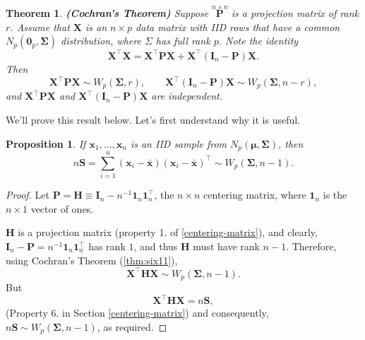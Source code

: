 \documentclass[
]{book}
\newtheorem{theorem}{Theorem}[chapter]
\newtheorem{proposition}{Proposition}[chapter]
\theoremstyle{definition}
\theoremstyle{definition}
\theoremstyle{definition}
\theoremstyle{definition}
\theoremstyle{remark}
\begin{document}
\begin{theorem}
\protect\hypertarget{thm:six11}{}{\label{thm:six11} }\textbf{(Cochran's Theorem)} Suppose \(\stackrel{n \times n}{\mathbf P}\) is a projection matrix of rank \(r\). Assume that \(\mathbf X\) is an \(n \times p\) data matrix with IID rows that have a common \(N_p({\mathbf 0}_p, \boldsymbol{\Sigma})\) distribution, where \(\Sigma\) has full rank \(p\). Note the identity
\begin{equation}
\mathbf X^\top \mathbf X= \mathbf X^\top {\mathbf P} \mathbf X+ \mathbf X^\top ({\mathbf I}_n -{\mathbf P})\mathbf X.
\label{eq:Cochran1}
\end{equation}
Then
\begin{equation}
\mathbf X^\top {\mathbf P} \mathbf X\sim W_p(\boldsymbol{\Sigma}, r), \qquad  \mathbf X^\top ({\mathbf I}_n -{\mathbf P})\mathbf X\sim W_p(\boldsymbol{\Sigma}, n-r),
\label{eq:Cochran2}
\end{equation}
and \(\mathbf X^\top {\mathbf P} \mathbf X\) and \(\mathbf X^\top ({\mathbf I}_n -{\mathbf P})\mathbf X\)
are independent.
\end{theorem}

We'll prove this result below. Let's first understand why it is useful.

\begin{proposition}
\protect\hypertarget{prp:six12}{}{\label{prp:six12} }If \(\mathbf x_1,\ldots,\mathbf x_n\) is an IID sample from \(N_p({\boldsymbol{\mu}},\boldsymbol{\Sigma})\), then
\[ n \mathbf S= \sum_{i=1}^n (\mathbf x_i - \bar{\mathbf x})(\mathbf x_i - \bar{\mathbf x})^\top \sim W_p(\boldsymbol{\Sigma},n-1).\]
\end{proposition}

\begin{proof}
Let \(\mathbf P= {\mathbf H}\equiv \mathbf I_n - n^{-1}{\mathbf 1}_n {\mathbf 1}_n^\top\), the \(n \times n\) centering matrix, where \({\mathbf 1}_n\) is the \(n \times 1\) vector of ones.

\(\mathbf H\) is a projection matrix (property 1. of \ref{centering-matrix}), and clearly, \(\mathbf I_n - \mathbf P=n^{-1} {\mathbf 1}_n {\mathbf 1}_n^\top\) has rank \(1\), and thus \(\mathbf H\) must have rank \(n-1\). Therefore, using Cochran's Theorem (\ref{thm:six11}),
\[
\mathbf X^\top \mathbf H\mathbf X\sim W_p(\boldsymbol{\Sigma}, n-1).
\]
But\\
\[\mathbf X^\top \mathbf H\mathbf X=n\mathbf S,\]
(Property 6. in Section \ref{centering-matrix})
and consequently, \(n\mathbf S\sim W_p(\boldsymbol{\Sigma}, n-1)\), as required.
\end{proof}
\end{document}

